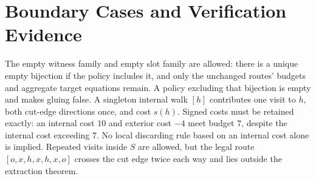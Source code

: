 \documentclass[11pt]{article}
\theoremstyle{remark}
\begin{document}
\section{Boundary Cases and Verification Evidence}
\label{sec:evidence}

The empty witness family and empty slot family are allowed: there is a unique
empty bijection if the policy includes it, and only the unchanged routes'
budgets and aggregate target equations remain. A policy excluding that
bijection is empty and makes gluing false. A singleton internal walk $[h]$
contributes one visit to $h$, both cut-edge directions once, and cost $s(h)$.
Signed costs must be retained exactly: an internal cost $10$ and exterior
cost $-4$ meet budget $7$, despite the internal cost exceeding $7$. No local
discarding rule based on an internal cost alone is implied. Repeated visits
inside $S$ are allowed, but the legal route $[o,x,h,x,h,x,o]$ crosses the cut
edge twice each way and lies outside the extraction theorem.
\end{document}
